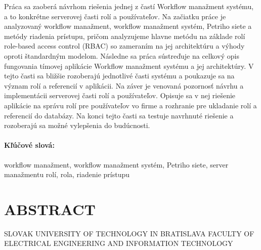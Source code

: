 \documentclass[12pt, oneside]{book}
\begin{document}
\noindent Práca sa zaoberá návrhom riešenia jednej z častí Workflow manažment systému, a to konkrétne serverovej časti rolí a používateľov.
 Na začiatku práce je analyzovaný workflow manažment, workflow manažment systém, Petriho siete a metódy riadenia prístupu, pričom analyzujeme hlavne metódu na základe rolí role-based access control (RBAC) so zameraním na jej architektúru a výhody oproti štandardným modelom.
Následne sa práca sústreďuje na celkový opis fungovania tímovej aplikácie Workflow manažment systému a jej architektúry. V tejto časti sa bližšie rozoberajú jednotlivé časti systému a poukazuje sa na význam rolí a referencií v aplikácii.
 Na záver je venovaná pozornosť návrhu a implementácii serverovej časti rolí a používateľov. Opisuje sa v nej riešenie aplikácie na správu rolí pre používateľov vo firme a rozhranie pre ukladanie rolí a referencií do databázy. Na konci tejto časti sa testuje navrhnuté riešenie a rozoberajú sa možné vylepšenia do budúcnosti.

 
\paragraph*{Kľúčové slová:} 
 workflow manažment, workflow manažment systém, Petriho siete, server manažmentu rolí, rola, riadenie prístupu

\newpage
\pagestyle{empty}	
\section*{\fontsize{21pt}{1.3}\selectfont ABSTRACT}
 
	\noindent SLOVAK UNIVERSITY OF TECHNOLOGY IN BRATISLAVA
	\newline
	{\fontsize{11pt}{1.3}\selectfont FACULTY OF ELECTRICAL ENGINEERING AND INFORMATION TECHNOLOGY\\ }
	
\end{document}

